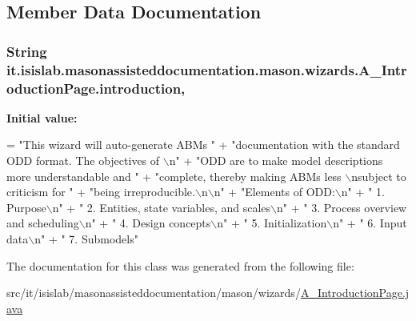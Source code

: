 \subsection{Member Data Documentation}
\hypertarget{classit_1_1isislab_1_1masonassisteddocumentation_1_1mason_1_1wizards_1_1_a___introduction_page_a2b1741f1921be08167b8d766305b1161}{
\subsubsection[{introduction}]{\setlength{\rightskip}{0pt plus 5cm}String it.\-isislab.\-masonassisteddocumentation.\-mason.\-wizards.\-A\-\_\-\-Introduction\-Page.\-introduction\hspace{0.3cm}{\ttfamily [static]}, {\ttfamily [private]}}}\label{classit_1_1isislab_1_1masonassisteddocumentation_1_1mason_1_1wizards_1_1_a___introduction_page_a2b1741f1921be08167b8d766305b1161}
{\bfseries Initial value\-:}
\begin{DoxyCode}
= \textcolor{stringliteral}{"This wizard will auto-generate ABMs "}
                            + \textcolor{stringliteral}{"documentation with the standard ODD format. The objectives of \(\backslash\)n"}
                            + \textcolor{stringliteral}{"ODD are to make model descriptions more understandable and "}
                            + \textcolor{stringliteral}{"complete, thereby making ABMs less \(\backslash\)nsubject to criticism for "}
                            + \textcolor{stringliteral}{"being irreproducible.\(\backslash\)n\(\backslash\)n"}
                            + \textcolor{stringliteral}{"Elements of ODD:\(\backslash\)n"}
                            + \textcolor{stringliteral}{"   1. Purpose\(\backslash\)n"}
                            + \textcolor{stringliteral}{"   2. Entities, state variables, and scales\(\backslash\)n"}
                            + \textcolor{stringliteral}{"   3. Process overview and scheduling\(\backslash\)n"}
                            + \textcolor{stringliteral}{"   4. Design concepts\(\backslash\)n"}
                            + \textcolor{stringliteral}{"   5. Initialization\(\backslash\)n"}  
                            + \textcolor{stringliteral}{"   6. Input data\(\backslash\)n"}
                            + \textcolor{stringliteral}{"   7. Submodels"}
\end{DoxyCode}


The documentation for this class was generated from the following file\-:\begin{DoxyCompactItemize}
\item 
src/it/isislab/masonassisteddocumentation/mason/wizards/\hyperlink{_a___introduction_page_8java}{A\-\_\-\-Introduction\-Page.\-java}\end{DoxyCompactItemize}

